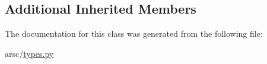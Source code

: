 \subsection*{Additional Inherited Members}


The documentation for this class was generated from the following file\+:\begin{DoxyCompactItemize}
\item 
arsc/\mbox{\hyperlink{types_8py}{types.\+py}}\end{DoxyCompactItemize}
